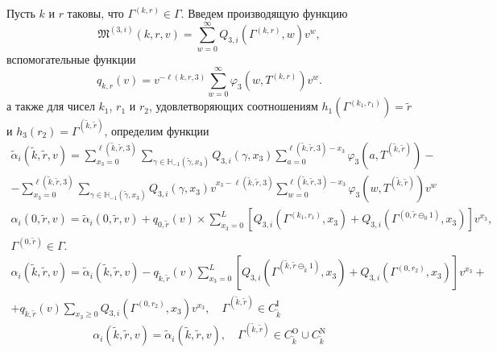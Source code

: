 \documentclass[a4paper,12pt,russian]{extarticle}
\begin{document}
Пусть $k$ и $r$ таковы, что $\Gamma^{(k,r)}\in \Gamma$. Введем производящую функцию
\begin{equation*}
\mathfrak{M}^{(3,i)}(k,r,v) = \sum_{w=0}^{\infty} Q_{3,i}(\Gamma^{(k,r)},w) v^w,
\end{equation*}
вспомогательные функции
\begin{equation*}
q_{k,r}(v) = v^{-\ell(k,r,3)}\sum_{w=0}^{\infty} \varphi_3(w,T^{(k,r)})v^w.
\end{equation*}
а также для чисел $k_1$, $r_1$ и $r_2$, удовлетворяющих соотношениям $h_1(\Gamma^{(k_1,r_1)}) = \tilde{r}$ и $h_3(r_2)=\Gamma^{(\tilde{k},\tilde{r})}$, определим функции
\begin{multline}
\tilde{\alpha}_i(\tilde{k},\tilde{r},v) = \sum_{x_3=0}^{\ell(\tilde{k},\tilde{r},3)}\sum_{\gamma \in {\mathbb H}_{-1}(\tilde{\gamma},x_3)} Q_{3,i}(\gamma,x_3) \sum_{a=0}^{\ell(\tilde{k},\tilde{r},3) - x_3} \varphi_3(a,T^{(\tilde{k},\tilde{r})}) - \\
- \sum_{x_3=0}^{\ell(\tilde{k},\tilde{r},3)}  \sum_{\gamma \in {\mathbb H}_{-1}(\tilde{\gamma},x_3)} Q_{3,i}(\gamma,x_3) v^{x_3-\ell(\tilde{k},\tilde{r},3)}  \sum_{w=0}^{\ell(\tilde{k},\tilde{r},3) -x_3}
\varphi_3(w,T^{(\tilde{k},\tilde{r})}) v^w
\end{multline}
\begin{multline}
\alpha_i(0,\tilde{r},v) =\tilde{\alpha}_i(0,\tilde{r},v) + q_{0,\tilde{r}}(v) \times \sum_{x_3=0}^{L} \left[ Q_{3,i}(\Gamma^{(k_1,r_1)},x_3) + Q_{3,i}(\Gamma^{(0,\tilde{r}\ominus_0 1)},x_3) \right] v^{x_3}, \\ \Gamma^{(0,\tilde{r})} \in \Gamma.
\end{multline}
\begin{multline}
\alpha_i(\tilde{k},\tilde{r},v) =\tilde{\alpha}_i(\tilde{k},\tilde{r},v) - q_{\tilde{k},\tilde{r}}(v)\sum_{x_3=0}^{L} \left[ Q_{3,i}(\Gamma^{(\tilde{k},\tilde{r}\ominus_{\tilde{k}} 1)},x_3) + Q_{3,i}(\Gamma^{(0,r_2)},x_3) \right] v^{x_3}+ \\ 
+ q_{\tilde{k},\tilde{r}}(v)  \sum_{x_3\geqslant 0} Q_{3,i}(\Gamma^{(0,r_2)},x_3) v^{x_3}, \quad \Gamma^{(\tilde{k}, \tilde{r})} \in C_{\tilde{k}}^{\mathrm{I}}
\end{multline}
\begin{equation}
\alpha_i(\tilde{k},\tilde{r},v) =\tilde{\alpha}_i(\tilde{k},\tilde{r},v), \quad \Gamma^{(\tilde{k}, \tilde{r})} \in C_{\tilde{k}}^{\mathrm{O}} \cup C_{\tilde{k}}^{\mathrm{N}}
\end{equation}
\end{document}
